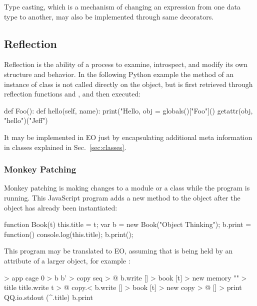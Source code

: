 \documentclass[sigplan,11pt,nonacm,natbib=false]{acmart}
\begin{document}
Type casting, which is a mechanism of changing an expression from one data type to another, may also be implemented through same decorators.

\subsection{Reflection}
\label{sec:reflection}

Reflection is the ability of a process to examine, introspect, and modify its own structure and behavior. In the following Python example the method  of an instance of class  is not called directly on the object, but is first retrieved through reflection functions  and , and then executed:

\begin{ffcode}
def Foo():
    def hello(self, name):
        print("Hello, %
obj = globals()["Foo"]()
getattr(obj, "hello")("Jeff")
\end{ffcode}

It may be implemented in EO just by encapsulating additional meta information in classes explained in Sec.~\ref{sec:classes}.

\subsubsection{Monkey Patching}

Monkey patching is making changes to a module or a class while the program is running. This JavaScript program adds a new method  to the object  after the object has already been instantiated:

\begin{ffcode}
function Book(t) { this.title = t; }
var b = new Book("Object Thinking");
b.print = function() {
  console.log(this.title);
}
b.print();
\end{ffcode}

This program may be translated to EO, assuming that  is being held by an attribute of a larger object, for example :

\begin{ffcode}
[] > app
  cage 0 > b
  b' > copy
  seq > @
    b.write
      [] > book
        [t] > new
          memory "" > title
          title.write t > @
    copy.<
    b.write
      [] > book
        [t] > new
          copy > @
            [] > print
              QQ.io.stdout (^.title)
    b.print
\end{ffcode}
\end{document}
